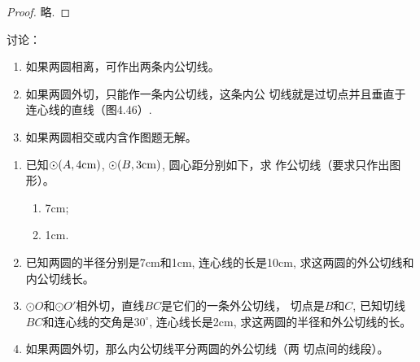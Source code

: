 \begin{proof}
  略.
\end{proof}

讨论：
\begin{enumerate}
\item 如果两圆相离，可作出两条内公切线。
\item 如果两圆外切，只能作一条内公切线，这条内公
切线就是过切点并且垂直于连心线的直线（图4.46）.
\item 如果两圆相交或内含作图题无解。
\end{enumerate}



\begin{ex}
\begin{enumerate}
    \item 已知$\odot(A,4{\rm cm})$, $\odot(B,3{\rm cm})$, 圆心距分别如下，求
    作公切线（要求只作出图形）。
\begin{multicols}{2}
    \begin{enumerate}
        \item 7cm;
        \item 1cm.
    \end{enumerate}
\end{multicols}
    \item 已知两圆的半径分别是7cm和1cm, 连心线的长是10cm, 
    求这两圆的外公切线和内公切线长。
    \item $\odot O$和$\odot O'$相外切，直线$BC$是它们的一条外公切线，
    切点是$B$和$C$, 已知切线$BC$和连心线的交角是$30^{\circ}$, 
    连心线长是2cm, 求这两圆的半径和外公切线的长。
    \item 如果两圆外切，那么内公切线平分两圆的外公切线（两
    切点间的线段）。
\end{enumerate}
\end{ex}

